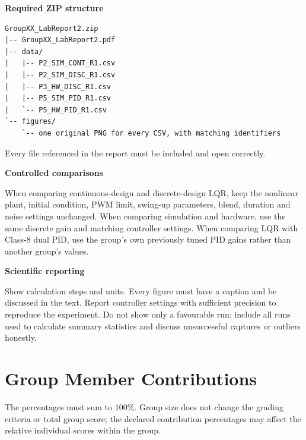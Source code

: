 \documentclass[11pt,a4paper]{article}
\begin{document}
\begin{requirementbox}
\textbf{Required ZIP structure}
\begin{verbatim}
GroupXX_LabReport2.zip
|-- GroupXX_LabReport2.pdf
|-- data/
|   |-- P2_SIM_CONT_R1.csv
|   |-- P2_SIM_DISC_R1.csv
|   |-- P3_HW_DISC_R1.csv
|   |-- P5_SIM_PID_R1.csv
|   `-- P5_HW_PID_R1.csv
`-- figures/
    `-- one original PNG for every CSV, with matching identifiers
\end{verbatim}
Every file referenced in the report must be included and open correctly.
\end{requirementbox}

\begin{requirementbox}
\textbf{Controlled comparisons}

When comparing continuous-design and discrete-design LQR, keep the nonlinear
plant, initial condition, PWM limit, swing-up parameters, blend, duration and
noise settings unchanged. When comparing simulation and hardware, use the same
discrete gain and matching controller settings. When comparing LQR with Class-8
dual PID, use the group's own previously tuned PID gains rather than another
group's values.
\end{requirementbox}



\begin{requirementbox}
\textbf{Scientific reporting}

Show calculation steps and units. Every figure must have a caption and be
discussed in the text. Report controller settings with sufficient precision to
reproduce the experiment. Do not show only a favourable run; include all runs
used to calculate summary statistics and discuss unsuccessful captures or
outliers honestly.
\end{requirementbox}
\clearpage
\fi

\tableofcontents
\clearpage

\section*{Group Member Contributions}

The percentages must sum to 100\%. Group size does not change the grading
criteria or total group score; the declared contribution percentages may affect
the relative individual scores within the group.
\end{document}
